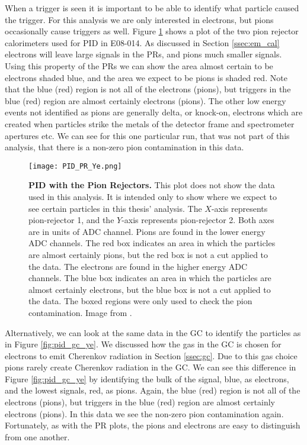 When a trigger is seen it is important to be able to identify what particle caused the trigger. For this analysis we are only interested in electrons, but pions occasionally cause triggers as well. Figure \ref{fig:pid_pr_ye} shows a plot of the two pion rejector calorimeters used for PID in E08-014. As discussed in Section \ref{ssec:em_cal} electrons will leave large signals in the PRs, and pions much smaller signals. Using this property of the PRs we can show the area almost certain to be electrons shaded blue, and the area we expect to be pions is shaded red. Note that the blue (red) region is not all of the electrons (pions), but triggers in the blue (red) region are almost certainly electrons (pions). The other low energy events not identified as pions are generally delta, or knock-on, electrons which are created when particles strike the metals of the detector frame and spectrometer apertures etc. We can see for this one particular run, that was not part of this analysis, that there is a non-zero pion contamination in this data. 

\begin{figure}[!ht]
\begin{center}
\texttt{[image: PID\_PR\_Ye.png]}
\end{center}
\caption[PID with the Pion Rejectors]{
{\bf{PID with the Pion Rejectors.}} This plot does not show the data used in this analysis. It is intended only to show where we expect to see certain particles in this thesis' analysis. The $X$-axis represents pion-rejector 1, and the $Y$-axis represents pion-rejector 2. Both axes are in units of ADC channel. Pions are found in the lower energy ADC channels. The red box indicates an area in which the particles are almost certainly pions, but the red box is not a cut applied to the data. The electrons are found in the higher energy ADC channels. The blue box indicates an area in which the particles are almost certainly electrons, but the blue box is not a cut applied to the data. The boxed regions were only used to check the pion contamination. Image from \cite{Thesis:Ye}.}
\label{fig:pid_pr_ye}
\end{figure}

Alternatively, we can look at the same data in the GC to identify the particles as in Figure \ref{fig:pid_gc_ye}. We discussed how the gas in the GC is chosen for electrons to emit Cherenkov radiation in Section \ref{ssec:gc}. Due to this gas choice pions rarely create Cherenkov radiation in the GC. We can see this difference in Figure \ref{fig:pid_gc_ye} by identifying the bulk of the signal, blue, as electrons, and the lowest signals, red, as pions. Again, the blue (red) region is not all of the electrons (pions), but triggers in the blue (red) region are almost certainly electrons (pions). In this data we see the non-zero pion contamination again. Fortunately, as with the PR plots, the pions and electrons are easy to distinguish from one another.

